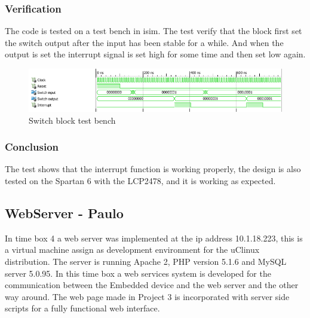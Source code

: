 \subsubsection{Verification}
%
The code is tested on a test bench in isim. The test verify that the block first set the switch output after the input has been stable for a while. And when the output is set the interrupt signal is set high for some time and then set low again. 
\begin{figure}[H]
	\begin{centering}
		\includegraphics[width=1.0\textwidth]{images/tb6_switch_tb.png}
		\caption{Switch block test bench}
	\end{centering}
\end{figure}
\subsubsection{Conclusion}
The test shows that the interrupt function is working properly, the design is also tested on the Spartan 6 with the LCP2478, and it is working as expected.
\subsection{WebServer - Paulo}
%
In time box 4 a web server was implemented at the ip address 10.1.18.223, this is a virtual machine assign as development environment for the uClinux distribution. The server is running Apache 2, PHP version 5.1.6 and MySQL server 5.0.95.
In this time box a web services system is developed for the communication between the Embedded device and the web server and the other way around. The web page made in Project 3 is incorporated with server side scripts for a fully functional web interface.
